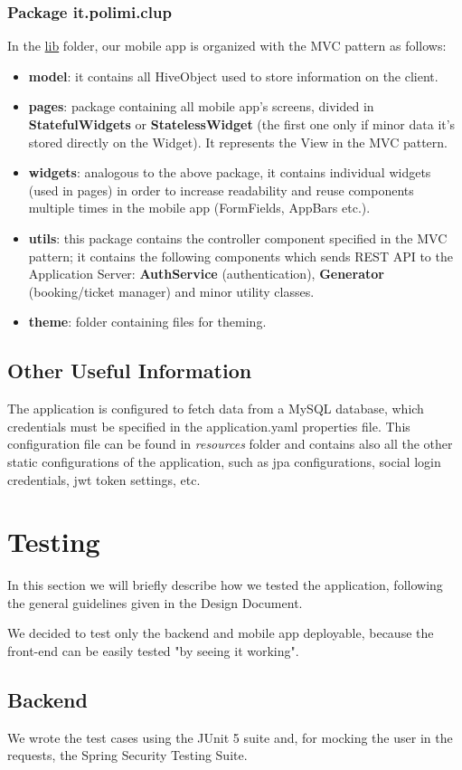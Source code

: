 \documentclass[table, 12pt]{article}
\begin{document}
\subsubsection*{Package it.polimi.clup}
In the \underline{lib} folder, our mobile app is organized with the MVC pattern as follows:
\begin{itemize}
    \item \textbf{model}: it contains all HiveObject used to store information on the client.
    \item \textbf{pages}: package containing all mobile app's screens, divided in \textbf{StatefulWidgets} or \textbf{StatelessWidget} (the first one only if minor data it's stored directly on the Widget). It represents the View in the MVC pattern.
    \item \textbf{widgets}: analogous to the above package, it contains individual widgets (used in pages) in order to increase readability and reuse components multiple times in the mobile app (FormFields, AppBars etc.).
    \item \textbf{utils}: this package contains the controller component specified in the MVC pattern; it contains the following components which sends REST API to the Application Server: \textbf{AuthService} (authentication), \textbf{Generator} (booking/ticket manager) and minor utility classes.
    \item \textbf{theme}: folder containing files for theming.
\end{itemize}
\subsection{Other Useful Information}
The application is configured to fetch data from a MySQL database, which credentials must be specified in the application.yaml properties file. This configuration file can be found in \textit{resources} folder and contains also all the other static configurations of the application, such as jpa configurations, social login credentials, jwt token settings, etc.
\newpage
\section{Testing}
\label{testing}
In this section we will briefly describe how we tested the application, following the general guidelines given in the Design Document.

We decided to test only the backend and mobile app deployable, because the front-end can be easily tested "by seeing it working".
\subsection{Backend}
We wrote the test cases using the JUnit 5 suite and, for mocking the user in the requests, the Spring Security Testing Suite.
\end{document}
